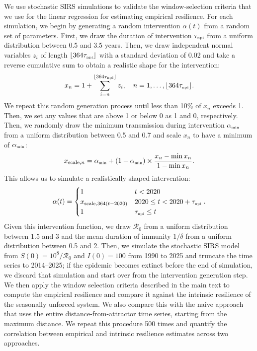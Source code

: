 \documentclass[12pt]{article}
\newcommand{\tsub}[2]{#1_{{\textrm{\tiny #2}}}}
\begin{document}
We use stochastic SIRS simulations to validate the window-selection criteria that we use for the linear regression for estimating empirical resilience.
For each simulation, we begin by generating a random intervention $\alpha(t)$ from a random set of parameters.
First, we draw the duration of intervention $\tsub{\tau}{npi}$ from a uniform distribution between 0.5 and 3.5 years.
Then, we draw independent normal variables $z_i$ of length $\lfloor 364 \tsub{\tau}{npi} \rfloor$ with a standard deviation of 0.02 and take a reverse cumulative sum to obtain a realistic shape for the intervention:
\begin{equation}
x_n = 1 + \sum_{i=n}^{\lfloor 364 \tsub{\tau}{npi}\rfloor} z_i, \quad n = 1, \dots, \lfloor 364 \tsub{\tau}{npi}\rfloor.
\end{equation}
We repeat this random generation process until less than 10\% of $x_n$ exceeds 1.
Then, we set any values that are above 1 or below 0 as 1 and 0, respectively.
Then, we randomly draw the minimum transmission during intervention $\tsub{\alpha}{min}$ from a uniform distribution between 0.5 and 0.7 and scale $x_n$ to have a minimum of $\tsub{\alpha}{min}$:
\begin{equation}
x_{\textrm{scale},n} =  \tsub{\alpha}{min} + (1- \tsub{\alpha}{min}) \times \frac{x_n-\min x_n}{1- \min x_n}.
\end{equation}
This allows us to simulate a realistically shaped intervention:
\begin{equation}
\alpha(t) = \begin{cases}
1 & t < 2020\\
x_{\textrm{scale},364(t-2020)} & 2020 \leq t < 2020 + \tsub{\tau}{npi}\\
1 & \tsub{\tau}{npi} \leq t
\end{cases}.
\end{equation}
Given this intervention function, we draw $\mathcal R_0$ from a uniform distribution between 1.5 and 3 and the mean duration of immunity $1/\delta$ from a uniform distribution between 0.5 and 2.
Then, we simulate the stochastic SIRS model from $S(0) = 10^8/\mathcal R_0$ and $I(0) = 100$ from 1990 to 2025 and truncate the time series to 2014--2025;
if the epidemic becomes extinct before the end of simulation, we discard that simulation and start over from the intervention generation step.
We then apply the window selection criteria described in the main text to compute the empirical resilience and compare it against the intrinsic resilience of the seasonally unforced system.
We also compare this with the naive approach that uses the entire distance-from-attractor time series, starting from the maximum distance.
We repeat this procedure 500 times and quantify the correlation between empirical and intrinsic resilience estimates across two approaches.
\end{document}
